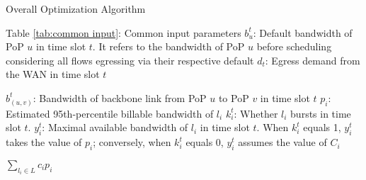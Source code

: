 \begin{algorithm}
	\caption{Overall Optimization Algorithm}
	\label{alg1}
	\begin{algorithmic}
		\renewcommand{\algorithmicrequire}{ \textbf{Inputs:}}
		\REQUIRE 
		\STATE Table \ref{tab:common input}: Common input parameters
            \STATE $b^t_u$: Default bandwidth of PoP $u$ in time slot $t$. It refers to the bandwidth of PoP $u$ before scheduling considering all flows egressing via their respective default {\egress} 
            \STATE $d_t$: Egress demand from the WAN in time slot $t$
		
		\renewcommand{\algorithmicensure}{ \textbf{Outputs:}}
		\ENSURE 
            
            \STATE $b^t_{(u,v)}$: Bandwidth of backbone link from PoP $u$ to PoP $v$ in time slot $t$
            \STATE $p_i$: Estimated 95th-percentile billable bandwidth of {\egress} $l_i$
            \STATE $k_{i}^t$: Whether {\egress} $l_i$ bursts in time slot $t$. 
            \STATE $y_i^t$: Maximal available bandwidth of {\egress} $l_i$ in time slot $t$. When $k_{i}^t$ equals 1, $y_i^t$ takes the value of $p_i$; conversely, when $k_{i}^t$ equals 0, $y_i^t$ assumes the value of $C_i$
		
		\renewcommand{\algorithmicensure}{ \textbf{Minimize:}}
		\ENSURE
		$\sum_{l_i \in L} c_i p_i$


\end{algorithmic}
\end{algorithm}
